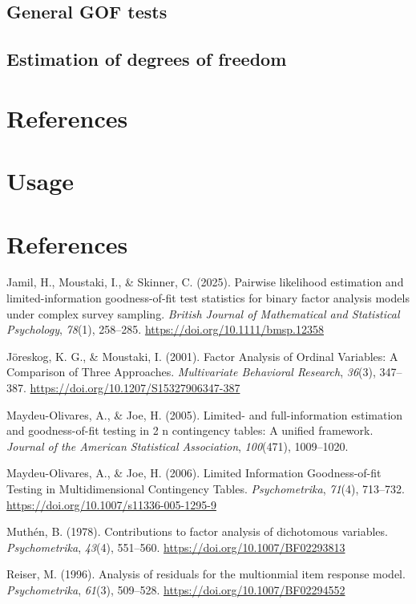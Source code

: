 \documentclass[
  letterpaper,
  DIV=11,
  numbers=noendperiod]{scrartcl}
\newlength{\cslhangindent}
\newenvironment{CSLReferences}[2] %
 {\begin{list}{}{%
  \setlength{\itemindent}{0pt}
  \setlength{\leftmargin}{0pt}
  \setlength{\parsep}{0pt}
  \ifodd #1
   \setlength{\leftmargin}{\cslhangindent}
   \setlength{\itemindent}{-1\cslhangindent}
  \fi
  \setlength{\itemsep}{#2\baselineskip}}}
 {\end{list}}
\begin{document}
\subsection{General GOF tests}\label{general-gof-tests}

\subsection{Estimation of degrees of
freedom}\label{estimation-of-degrees-of-freedom}

\section{References}\label{references}

\section{Usage}\label{usage}

\section*{References}\label{references-1}

\label{refs}
\begin{CSLReferences}{1}{0}
Jamil, H., Moustaki, I., \& Skinner, C. (2025). Pairwise likelihood
estimation and limited-information goodness-of-fit test statistics for
binary factor analysis models under complex survey sampling.
\emph{British Journal of Mathematical and Statistical Psychology},
\emph{78}(1), 258--285. \url{https://doi.org/10.1111/bmsp.12358}

Jöreskog, K. G., \& Moustaki, I. (2001). Factor {Analysis} of {Ordinal
Variables}: {A Comparison} of {Three Approaches}. \emph{Multivariate
Behavioral Research}, \emph{36}(3), 347--387.
\url{https://doi.org/10.1207/S15327906347-387}

Maydeu-Olivares, A., \& Joe, H. (2005). Limited- and full-information
estimation and goodness-of-fit testing in 2 n contingency tables: {A}
unified framework. \emph{Journal of the American Statistical
Association}, \emph{100}(471), 1009--1020.

Maydeu-Olivares, A., \& Joe, H. (2006). Limited {Information
Goodness-of-fit Testing} in {Multidimensional Contingency Tables}.
\emph{Psychometrika}, \emph{71}(4), 713--732.
\url{https://doi.org/10.1007/s11336-005-1295-9}

Muthén, B. (1978). Contributions to factor analysis of dichotomous
variables. \emph{Psychometrika}, \emph{43}(4), 551--560.
\url{https://doi.org/10.1007/BF02293813}

Reiser, M. (1996). Analysis of residuals for the multionmial item
response model. \emph{Psychometrika}, \emph{61}(3), 509--528.
\url{https://doi.org/10.1007/BF02294552}

\end{CSLReferences}
\end{document}
